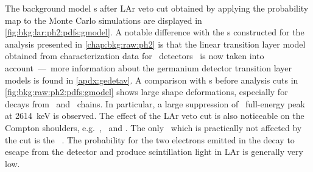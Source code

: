 The background model \pdf{}s after LAr veto cut obtained by applying the probability map
to the Monte Carlo simulations are displayed in \cref{fig:bkg:lar:ph2:pdfs:gmodel}. A
notable difference with the \pdf{}s constructed for the analysis presented in
\cref{chap:bkg:raw:ph2} is that the linear transition layer model obtained from
characterization data for \bege\ detectors~\cite{Lehnert2016} is now taken into
account~---~more information about the germanium detector transition layer models is found
in \cref{apdx:gedetav}. A comparison with \pdf{}s before analysis cuts in
\cref{fig:bkg:raw:ph2:pdfs:gmodel} shows large shape deformations, especially for decays
from \Uh\ and \Thh\ chains. In particular, a large suppression of \Tl\ full-energy peak at
2614~keV is observed. The effect of the LAr veto cut is also noticeable on the Compton
shoulders, e.g.~\kvn, \kvz\ and \Co. The only \pdf\ which is practically not affected by
the cut is the \nnbb\ \pdf. The probability for the two electrons emitted in the decay to
escape from the detector and produce scintillation light in LAr is generally very low.

